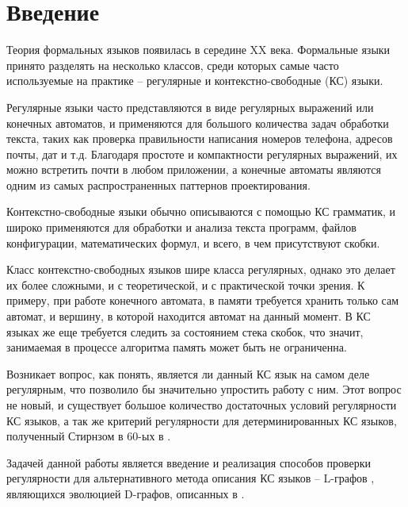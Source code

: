 \chapter*{Введение} \label{chapter0}

Теория формальных языков появилась в середине XX века. 
Формальные языки принято разделять на несколько классов, среди которых самые часто используемые на практике -- 
регулярные и контекстно-свободные (КС) языки. 

Регулярные языки часто представляются в виде регулярных выражений или
конечных автоматов, и применяются для большого количества задач обработки текста, 
таких как проверка правильности написания номеров телефона, адресов почты, дат и т.д.
Благодаря простоте и компактности регулярных выражений, их можно встретить почти в любом
приложении, а конечные автоматы являются одним из самых распространенных паттернов проектирования.

Контекстно-свободные языки обычно описываются с помощью КС грамматик,
и широко применяются для обработки и анализа текста программ, файлов конфигурации, математических
формул, и всего, в чем присутствуют скобки.

Класс контекстно-свободных языков шире класса регулярных, однако это делает их более сложными,
и с теоретической, и с практической точки зрения. К примеру, при работе конечного автомата,
в памяти требуется хранить только сам автомат, и вершину, в которой находится автомат на данный 
момент. В КС языках же еще требуется следить за состоянием стека скобок,
что значит, занимаемая в процессе алгоритма память может быть не ограниченна. 

Возникает вопрос, как понять, является ли данный КС язык на самом деле регулярным, что позволило бы
значительно упростить работу с ним. Этот вопрос не новый, и существует большое количество
достаточных условий регулярности КС языков, а так же критерий регулярности для детерминированных КС
языков, полученный Стирнзом в 60-ых в \cite{stearns_reg}.

Задачей данной работы является введение и реализация способов проверки регулярности для альтернативного 
метода описания КС языков -- L-графов \cite{vylitok_rostovski_o_podklassah,vylitok_sutirin_harakterizacia}, являющихся эволюцией D-графов, описанных в \cite{stan1}.


\clearpage
